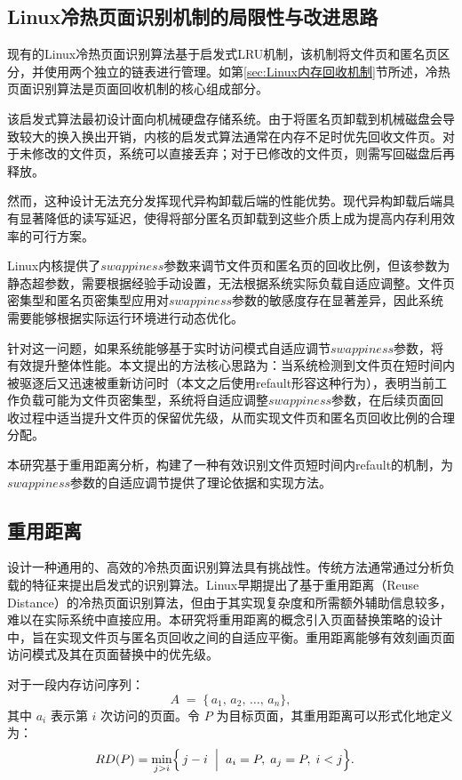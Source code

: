 \subsection{Linux冷热页面识别机制的局限性与改进思路}
现有的Linux冷热页面识别算法基于启发式LRU机制，该机制将文件页和匿名页区分，并使用两个独立的链表进行管理。如第\ref{sec:Linux内存回收机制}节所述，冷热页面识别算法是页面回收机制的核心组成部分。

该启发式算法最初设计面向机械硬盘存储系统。由于将匿名页卸载到机械磁盘会导致较大的换入换出开销，内核的启发式算法通常在内存不足时优先回收文件页。对于未修改的文件页，系统可以直接丢弃；对于已修改的文件页，则需写回磁盘后再释放。

然而，这种设计无法充分发挥现代异构卸载后端的性能优势。现代异构卸载后端具有显著降低的读写延迟，使得将部分匿名页卸载到这些介质上成为提高内存利用效率的可行方案。

Linux内核提供了\(swappiness\)参数来调节文件页和匿名页的回收比例，但该参数为静态超参数，需要根据经验手动设置，无法根据系统实际负载自适应调整。文件页密集型和匿名页密集型应用对\(swappiness\)参数的敏感度存在显著差异，因此系统需要能够根据实际运行环境进行动态优化。

针对这一问题，如果系统能够基于实时访问模式自适应调节\(swappiness\)参数，将有效提升整体性能。本文提出的方法核心思路为：当系统检测到文件页在短时间内被驱逐后又迅速被重新访问时（本文之后使用refault形容这种行为），表明当前工作负载可能为文件页密集型，系统将自适应调整\(swappiness\)参数，在后续页面回收过程中适当提升文件页的保留优先级，从而实现文件页和匿名页回收比例的合理分配。

本研究基于重用距离分析，构建了一种有效识别文件页短时间内refault的机制，为\(swappiness\)参数的自适应调节提供了理论依据和实现方法。

\subsection{重用距离}

设计一种通用的、高效的冷热页面识别算法具有挑战性。传统方法通常通过分析负载的特征来提出启发式的识别算法。Linux早期提出了基于重用距离（Reuse Distance）的冷热页面识别算法，但由于其实现复杂度和所需额外辅助信息较多，难以在实际系统中直接应用。本研究将重用距离的概念引入页面替换策略的设计中，旨在实现文件页与匿名页回收之间的自适应平衡。重用距离能够有效刻画页面访问模式及其在页面替换中的优先级。

对于一段内存访问序列：
\[
  A \;=\;\{\,a_1,\,a_2,\,\dots,\,a_n\},
\]
其中 \(a_i\) 表示第 \(i\) 次访问的页面。令 \(P\) 为目标页面，其重用距离可以形式化地定义为：
\begin{align}
\label{eq:rd_def}
  RD(P) 
  &= 
  \min_{j>i}\Bigl\{\,j - i
    \;\Bigm|\;
    a_i = P,\;
    a_j = P,\;
    i < j
  \Bigr\}.
\end{align}

